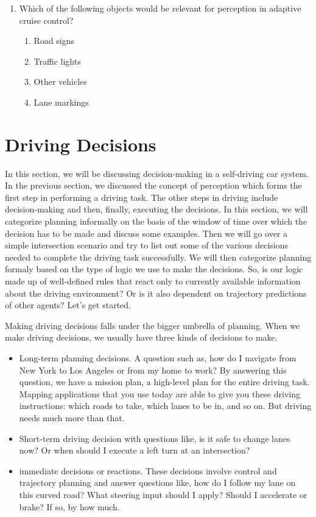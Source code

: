 \begin{enumerate}
\item Which of the following objects would be relevant for perception in adaptive cruise control?


\begin{enumerate}
\item Road signs
\item Traffic lights
\item Other vehicles
\item Lane markings
\end{enumerate}

\end{enumerate}


\section{Driving Decisions}
\label{driving_decisions}
In this section, we will be discussing decision-making in a self-driving car system. 
In the previous section, we discussed the concept of perception which forms the first step in performing a driving task. 
The other steps in driving include decision-making and then, finally, executing the decisions. 
In this section, we will categorize planning informally on the basis of the window of time over which the decision has to be made and discuss some examples. 
Then we will go over a simple intersection scenario and try to list out some of the various decisions needed to complete the driving task successfully. 
We will then categorize planning formaly based on the type of logic we use to make the decisions. 
So, is our logic made up of well-defined rules that react only to currently available information about the driving environment? 
Or is it also dependent on trajectory predictions of other agents? Let's get started. 


Making driving decisions falls under the bigger umbrella of planning. When we make driving decisions, we usually have three kinds of decisions to make. 

\begin{itemize}
\item Long-term planning decisions. A question such as, how do I navigate from New York to Los Angeles or from my home to work? By answering this question, we have a mission plan, a high-level plan for the entire driving task. Mapping applications that you use today are able to give you these driving instructions: which roads to take, which lanes to be in, and so on. But driving needs much more than that. 
\item Short-term driving decision with questions like, is it safe to change lanes now? Or when should I execute a left turn at an intersection? 
\item immediate decisions or reactions. These decisions involve control and trajectory planning and answer questions like, how do I follow my lane on this curved road? 
What steering input should I apply? Should I accelerate or brake? If so, by how much.
\end{itemize} 


